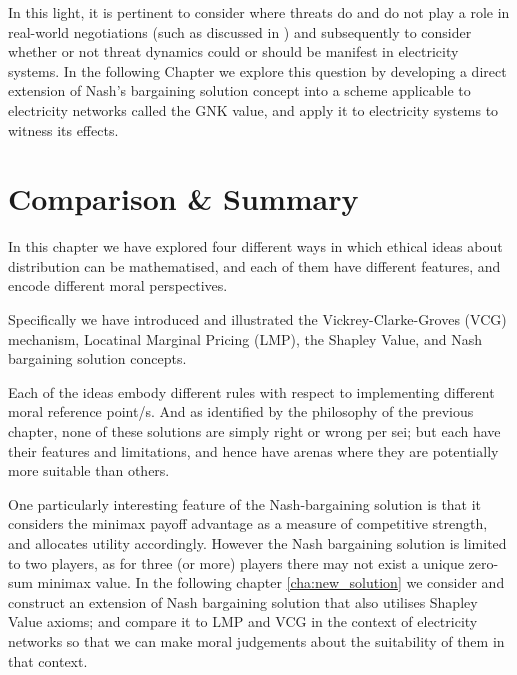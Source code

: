 In this light, it is pertinent to consider where threats do and do not play a role in real-world negotiations (such as discussed in \cite{anbarci2002comparing}) and subsequently to consider whether or not threat dynamics could or should be manifest in electricity systems.
In the following Chapter we explore this question by developing a direct extension of Nash's bargaining solution concept into a scheme applicable to electricity networks called the GNK value, and apply it to electricity systems to witness its effects.%




\section{Comparison \& Summary}

In this chapter we have explored four different ways in which ethical ideas about distribution can be mathematised, and each of them have different features, and encode different moral perspectives.

Specifically we have introduced and illustrated the Vickrey-Clarke-Groves (VCG) mechanism, Locatinal Marginal Pricing (LMP), the Shapley Value, and Nash bargaining solution concepts.

Each of the ideas embody different rules with respect to implementing different moral reference point/s.
And as identified by the philosophy of the previous chapter, none of these solutions are simply right or wrong per sei; but each have their features and limitations, and hence have arenas where they are potentially more suitable than others.

One particularly interesting feature of the Nash-bargaining solution is that it considers the minimax payoff advantage as a measure of competitive strength, and allocates utility accordingly.
However the Nash bargaining solution is limited to two players, as for three (or more) players there may not exist a unique zero-sum minimax value.
In the following chapter \ref{cha:new_solution} we consider and construct an extension of Nash bargaining solution that also utilises Shapley Value axioms; and compare it to LMP and VCG in the context of electricity networks so that we can make moral judgements about the suitability of them in that context.





